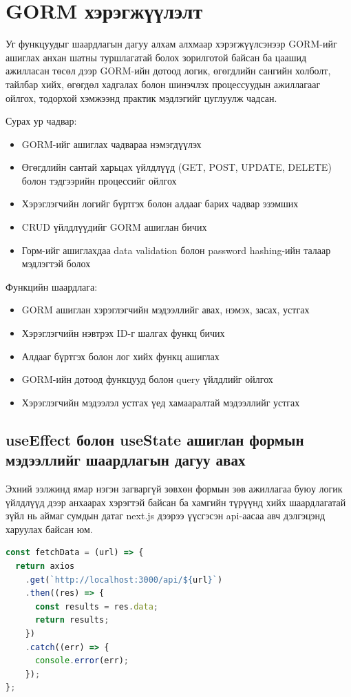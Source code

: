 \section{GORM хэрэгжүүлэлт}

Уг функцуудыг шаардлагын дагуу алхам алхмаар хэрэгжүүлсэнээр GORM-ийг ашиглах анхан шатны туршлагатай болох зорилготой байсан ба цаашид ажилласан төсөл дээр GORM-ийн дотоод логик, өгөгдлийн сангийн холболт, тайлбар хийх, өгөгдөл хадгалах болон шинэчлэх процессуудын ажиллагааг ойлгох, тодорхой хэмжээнд практик мэдлэгийг цуглуулж чадсан.

Сурах ур чадвар: 
\begin{itemize} \item GORM-ийг ашиглах чадвараа нэмэгдүүлэх 
	\item Өгөгдлийн сантай харьцах үйлдлүүд (GET, POST, UPDATE, DELETE) болон тэдгээрийн процессийг ойлгох 
	\item Хэрэглэгчийн логийг бүртгэх болон алдааг барих чадвар эзэмших 
	\item CRUD үйлдлүүдийг GORM ашиглан бичих 
	\item Горм-ийг ашиглахдаа data validation болон password hashing-ийн талаар мэдлэгтэй болох \end{itemize}

Функцийн шаардлага: 
\begin{itemize} 
	\item GORM ашиглан хэрэглэгчийн мэдээллийг авах, нэмэх, засах, устгах 
	\item Хэрэглэгчийн нэвтрэх ID-г шалгах функц бичих 
	\item Алдааг бүртгэх болон лог хийх функц ашиглах 
	\item GORM-ийн дотоод функцууд болон query үйлдлийг ойлгох 
	\item Хэрэглэгчийн мэдээлэл устгах үед хамааралтай мэдээллийг устгах
\end{itemize}
	
\subsection{useEffect болон useState ашиглан формын мэдээллийг шаардлагын дагуу авах}

Эхний ээлжинд ямар нэгэн загваргүй зөвхөн формын зөв ажиллагаа буюу логик үйлдлүүд дээр анхаарах хэрэгтэй байсан ба хамгийн түрүүнд хийх шаардлагатай зүйл нь аймаг сумдын датаг next.js дээрээ үүсгэсэн api-аасаа авч дэлгэцэнд харуулах байсан юм. 

\begin{lstlisting}[language=Javascript, caption=Next.js дээр бичсэн серверээс датагаа татаж авах, frame=single]
const fetchData = (url) => {
  return axios
    .get(`http://localhost:3000/api/${url}`)
    .then((res) => {
      const results = res.data;
      return results;
    })
    .catch((err) => {
      console.error(err);
    });
};
\end{lstlisting}

